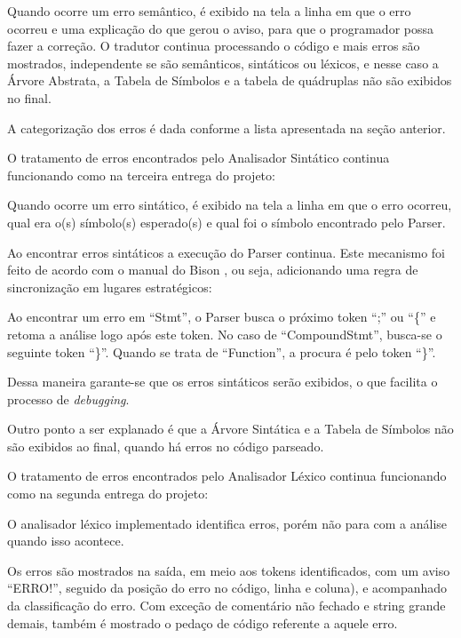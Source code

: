 \documentclass[12pt]{article}
\begin{document}
Quando ocorre um erro semântico, é exibido na tela a linha em que o erro ocorreu e uma explicação do que gerou o aviso, para que o programador possa fazer a correção. O tradutor continua processando o código e mais erros são mostrados, independente se são semânticos, sintáticos ou léxicos, e nesse caso a Árvore Abstrata, a Tabela de Símbolos e a tabela de quádruplas não são exibidos no final.

A categorização dos erros é dada conforme a lista apresentada na seção anterior.

O tratamento de erros encontrados pelo Analisador Sintático continua funcionando como na terceira entrega do projeto:

Quando ocorre um erro sintático, é exibido na tela a linha em que o erro ocorreu, qual era o(s) símbolo(s) esperado(s) e qual foi o símbolo encontrado pelo Parser.

Ao encontrar erros sintáticos a execução do Parser continua. Este mecanismo foi feito de acordo com o manual do Bison \cite{bisonmanual}, ou seja, adicionando uma regra de sincronização em lugares estratégicos:

Ao encontrar um erro em ``Stmt'', o Parser busca o próximo token ``;'' ou ``\{'' e retoma a análise logo após este token. No caso de ``CompoundStmt'', busca-se o seguinte token ``\}''. Quando se trata de ``Function'', a procura é pelo token ``\}''.

Dessa maneira garante-se que os erros sintáticos serão exibidos, o que facilita o processo de \textit{debugging}.

Outro ponto a ser explanado é que a Árvore Sintática e a Tabela de Símbolos não são exibidos ao final, quando há erros no código parseado.

O tratamento de erros encontrados pelo Analisador Léxico continua funcionando como na segunda entrega do projeto:

O analisador léxico implementado identifica erros, porém não para com a análise quando isso acontece.

Os erros são mostrados na saída, em meio aos tokens identificados, com um aviso ``ERRO!'', seguido da posição do erro no código, linha e coluna), e acompanhado da classificação do erro. Com exceção de comentário não fechado e string grande demais, também é mostrado o pedaço de código referente a aquele erro.
\end{document}
